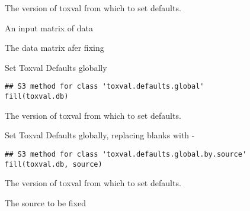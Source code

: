 \documentclass[letterpaper]{book}
\begin{document}
%
\begin{Arguments}
\begin{ldescription}
\item[\code{toxval.db}] The version of toxval from which to set defaults.

\item[\code{mat}] An input matrix of data
\end{ldescription}
\end{Arguments}
%
\begin{Value}
The data matrix afer fixing
\end{Value}
%
\begin{Description}\relax
Set Toxval Defaults globally
\end{Description}
%
\begin{Usage}
\begin{verbatim}
## S3 method for class 'toxval.defaults.global'
fill(toxval.db)
\end{verbatim}
\end{Usage}
%
\begin{Arguments}
\begin{ldescription}
\item[\code{toxval.db}] The version of toxval from which to set defaults.
\end{ldescription}
\end{Arguments}
%
\begin{Description}\relax
Set Toxval Defaults globally,  replacing blanks with -
\end{Description}
%
\begin{Usage}
\begin{verbatim}
## S3 method for class 'toxval.defaults.global.by.source'
fill(toxval.db, source)
\end{verbatim}
\end{Usage}
%
\begin{Arguments}
\begin{ldescription}
\item[\code{toxval.db}] The version of toxval from which to set defaults.

\item[\code{source}] The source to be fixed
\end{ldescription}
\end{Arguments}
\end{document}
